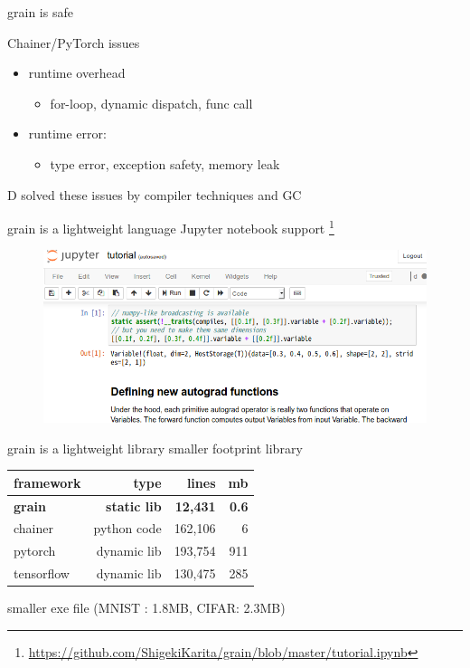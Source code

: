 \documentclass[aspectratio=169,
  14pt,xcolor=dvipsnames,table,professional font,dvipdfmx]{beamer}
\begin{document}
\begin{frame}{grain is \alert{safe}}
  \begin{alertblock}{Chainer/PyTorch issues}
  \begin{itemize}
  \item runtime overhead
    \begin{itemize}
    \item for-loop, dynamic dispatch, func call
    \end{itemize}
  \item runtime error:
    \begin{itemize}
    \item type error, exception safety, memory leak
    \end{itemize}
  \end{itemize}
  \end{alertblock}
  \begin{center}
    \alert{D solved these issues} by compiler techniques and GC
  \end{center}
\end{frame}

\begin{frame}[fragile]{grain is \alert{a lightweight language}}
  Jupyter notebook support
  \footnote{\alert{\url{https://github.com/ShigekiKarita/grain/blob/master/tutorial.ipynb}}}
  \begin{figure}[b]
	\centering
	\includegraphics[height=0.6\textheight]{./fig/jupyterd.png}
  \end{figure}
  \scriptsize
\end{frame}

\begin{frame}[fragile]{grain is \alert{a lightweight library}}
  smaller footprint library
  \begin{table}
	\begin{tabular}{lrrr}
      \toprule
      framework  & type        &   lines & mb \\
      \midrule
      \textbf{grain} & \textbf{static lib}  &  \textbf{12,431} & \textbf{0.6} \\
      chainer    & python code & 162,106 & 6 \\
      pytorch    & dynamic lib & 193,754 & 911 \\
      tensorflow & dynamic lib & 130,475 & 285 \\
      \bottomrule
	\end{tabular}
  \end{table}
  smaller exe file (MNIST : 1.8MB, CIFAR: 2.3MB)
\end{frame}
\end{document}
